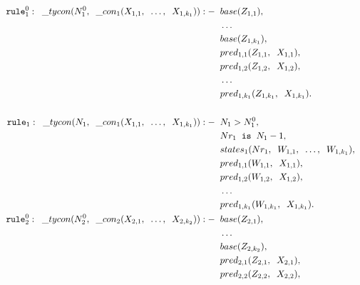 \begin{align*}
	\ttt{rule}_{1}^{0}: \tav \_ tycon (N_{1}^{0}, \tav \_ con_1(X_{1,1}, \tav \ldots, \tav X_{1,k_1})) :-
	  & \tav base(Z_{1,1}),                                             &   &   \\
	  & \tav \ldots                                                     &   &   \\
	  & \tav base(Z_{1,k_1}),                                           &   &   \\
	  & \tav pred_{1, 1}(Z_{1,1}, \tav X_{1,1}),                        &   &   \\
	  & \tav pred_{1, 2}(Z_{1,2}, \tav X_{1,2}),                        &   &   \\
	  & \tav \ldots \tav                                                &   &   \\
	  & \tav pred_{1, k_1}(Z_{1,k_1}, \tav X_{1,k_1}).                  &   &   \\
	\\
	\ttt{rule}_1: \tav \_ tycon (N_1, \tav \_ con_1(X_{1,1}, \tav \ldots, \tav X_{1,k_1})) :-
	  & \tav N_1 > N_{1}^{0},                                           &   &   \\
	  & \tav Nr_1 \tav \ttt{is} \tav N_1 - 1,                           &   &   \\
	  & \tav states_1(Nr_1, \tav W_{1,1}, \tav \ldots, \tav W_{1,k_1}), &   &   \\
	  & \tav pred_{1, 1}(W_{1,1}, \tav X_{1,1}),                        &   &   \\
	  & \tav pred_{1, 2}(W_{1,2}, \tav X_{1,2}),                        &   &   \\
	  & \tav \ldots \tav                                                &   &   \\
	  & \tav pred_{1, k_1}(W_{1,k_1}, \tav X_{1,k_1}).                  &   &   \\
	\ttt{rule}_{2}^{0}: \tav \_ tycon (N_{2}^{0}, \tav \_ con_2(X_{2,1}, \tav \ldots, \tav X_{2,k_2})) :-
	  & \tav base(Z_{2,1}),                                             &   &   \\
	  & \tav \ldots                                                     &   &   \\
	  & \tav base(Z_{2,k_2}),                                           &   &   \\
	  & \tav pred_{2, 1}(Z_{2,1}, \tav X_{2,1}),                        &   &   \\
	  & \tav pred_{2, 2}(Z_{2,2}, \tav X_{2,2}),                        &   &   \\

\end{align*}

